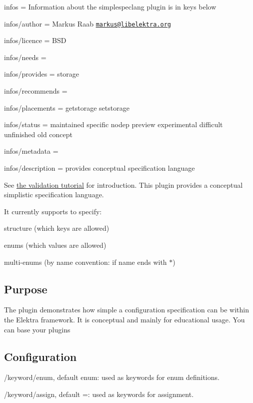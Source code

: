 
\begin{DoxyItemize}
\item infos = Information about the simplespeclang plugin is in keys below
\item infos/author = Markus Raab \href{mailto:markus@libelektra.org}{\tt markus@libelektra.\+org}
\item infos/licence = B\+S\+D
\item infos/needs =
\item infos/provides = storage
\item infos/recommends =
\item infos/placements = getstorage setstorage
\item infos/status = maintained specific nodep preview experimental difficult unfinished old concept
\item infos/metadata =
\item infos/description = provides conceptual specification language
\end{DoxyItemize}

See \hyperlink{doc_tutorials_validation_md}{the validation tutorial} for introduction. This plugin provides a conceptual simplistic specification language.

It currently supports to specify\+:


\begin{DoxyItemize}
\item structure (which keys are allowed)
\item enums (which values are allowed)
\item multi-\/enums (by name convention\+: if name ends with {\ttfamily $\ast$})
\end{DoxyItemize}

\subsection*{Purpose}

The plugin demonstrates how simple a configuration specification can be within the Elektra framework. It is conceptual and mainly for educational usage. You can base your plugins

\subsection*{Configuration}


\begin{DoxyItemize}
\item {\ttfamily /keyword/enum}, default {\ttfamily enum}\+: used as keywords for enum definitions.
\item {\ttfamily /keyword/assign}, default {\ttfamily =}\+: used as keywords for assignment.
\end{DoxyItemize}

